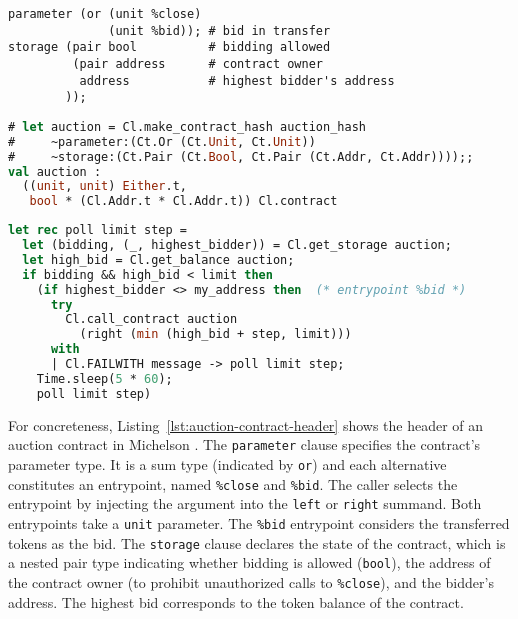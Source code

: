 \documentclass[runningheads]{llncs}
\begin{document}
\begin{lstlisting}[language=michelson,numbers=none,float={tp},caption={Header of the auction contract},label={lst:auction-contract-header},captionpos=b,emph={close,bid},emphstyle=\underbar]
parameter (or (unit %close)
              (unit %bid)); # bid in transfer
storage (pair bool          # bidding allowed
         (pair address      # contract owner
          address           # highest bidder's address
        ));
\end{lstlisting}
\begin{lstlisting}[language=Caml,float={tp},caption={Getting the auction handle},label={lst:getting-auction-handle},numbers=none]
# let auction = Cl.make_contract_hash auction_hash
#     ~parameter:(Ct.Or (Ct.Unit, Ct.Unit))
#     ~storage:(Ct.Pair (Ct.Bool, Ct.Pair (Ct.Addr, Ct.Addr))));;
val auction :
  ((unit, unit) Either.t,
   bool * (Cl.Addr.t * Cl.Addr.t)) Cl.contract
\end{lstlisting}
\begin{lstlisting}[language=Caml,float={tp},caption={Bidding strategy},label={lst:bidding-strategy},numbers=none]
let rec poll limit step =
  let (bidding, (_, highest_bidder)) = Cl.get_storage auction;
  let high_bid = Cl.get_balance auction;
  if bidding && high_bid < limit then
    (if highest_bidder <> my_address then  (* entrypoint %bid *)
      try
        Cl.call_contract auction
          (right (min (high_bid + step, limit))) 
      with
      | Cl.FAILWITH message -> poll limit step;
    Time.sleep(5 * 60);
    poll limit step)
\end{lstlisting}
For concreteness, Listing~\ref{lst:auction-contract-header} shows the
header of an auction contract in Michelson \cite{michelson}. The
\lstinline/parameter/ clause specifies the contract's parameter
type. It is a sum type (indicated by \lstinline/or/) and each
alternative constitutes an entrypoint, named \lstinline/%close/ and
\lstinline/%bid/. The caller selects the entrypoint by injecting the argument into the
\lstinline/left/ or \lstinline/right/ summand. Both entrypoints take a \lstinline/unit/
parameter. The \lstinline/%bid/ entrypoint considers the transferred
tokens as the bid.
The \lstinline/storage/ clause declares the state of the contract,
which is a nested pair type indicating whether bidding is allowed
(\lstinline/bool/), the address of the contract owner (to prohibit
unauthorized calls to \lstinline/%close/), and the bidder's
address. The highest bid corresponds to the token balance of the contract.
\end{document}

